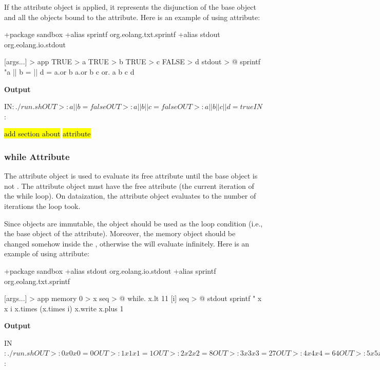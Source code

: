 \documentclass[12pt]{book}
\begin{document}
{If the  attribute object is applied, it represents the disjunction of the base  object and all the objects bound to the  attribute. Here is an example of using  attribute:

\begin{ffcode}
+package sandbox
+alias sprintf org.eolang.txt.sprintf
+alias stdout org.eolang.io.stdout

[args...] > app
  TRUE > a
  TRUE > b
  TRUE > c
  FALSE > d
  stdout > @
    sprintf
      "a || b = %
      || d = %
      a.or b
      a.or b c
      or.
        a
        b
        c
        d
\end{ffcode}
\textbf{Output}
\begin{ffcode}
IN$: ./run.sh
OUT>: a || b = false
OUT>: a || b || c = false
OUT>: a || b || c || d = true
IN$: 
\end{ffcode}

\hl{add section about}  \hl{attribute}

\subsubsection{while Attribute}
The  attribute object is used to evaluate its  free attribute until the base  object is not .
The  attribute object must have the free attribute  (the current iteration of the while loop).
On dataization, the  attribute object evaluates to the number of iterations the loop took.

Since objects are immutable, the  object should be used as the loop condition (i.e., the base  object of the  attribute). Moreover, the memory object should be changed somehow inside the , otherwise the  will evaluate infinitely. Here is an example of using  attribute:

\begin{ffcode}
+package sandbox
+alias stdout org.eolang.io.stdout
+alias sprintf org.eolang.txt.sprintf

[args...] > app
  memory 0 > x
  seq > @
    while.
      x.lt 11
      [i]
        seq > @
          stdout
            sprintf "%
              x
              x
              i
              x.times (x.times i)
          x.write
            x.plus 1
\end{ffcode}
\textbf{Output} 
\begin{ffcode}
IN$: ./run.sh
OUT>: 0 x 0 x 0 = 0
OUT>: 1 x 1 x 1 = 1
OUT>: 2 x 2 x 2 = 8
OUT>: 3 x 3 x 3 = 27
OUT>: 4 x 4 x 4 = 64
OUT>: 5 x 5 x 5 = 125
OUT>: 6 x 6 x 6 = 216
OUT>: 7 x 7 x 7 = 343
OUT>: 8 x 8 x 8 = 512
OUT>: 9 x 9 x 9 = 729
OUT>: 10 x 10 x 10 = 1000
IN$: 
\end{ffcode}

}
\end{document}
